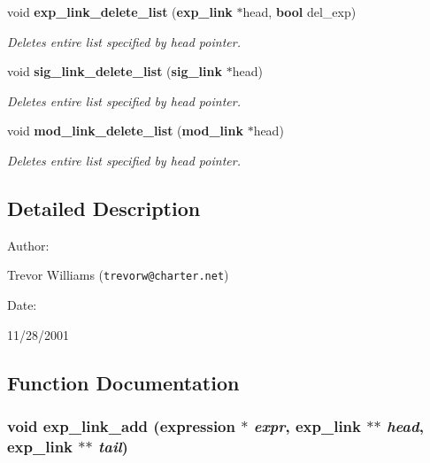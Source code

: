 \begin{CompactItemize}
void {\bf exp\_\-link\_\-delete\_\-list} ({\bf exp\_\-link} $\ast$head, {\bf bool} del\_\-exp)
\begin{CompactList}\small\item\em Deletes entire list specified by head pointer.\item\end{CompactList}\item 
void {\bf sig\_\-link\_\-delete\_\-list} ({\bf sig\_\-link} $\ast$head)
\begin{CompactList}\small\item\em Deletes entire list specified by head pointer.\item\end{CompactList}\item 
void {\bf mod\_\-link\_\-delete\_\-list} ({\bf mod\_\-link} $\ast$head)
\begin{CompactList}\small\item\em Deletes entire list specified by head pointer.\item\end{CompactList}\end{CompactItemize}


\subsection{Detailed Description}


\begin{Desc}
\item[Author: ]\par
Trevor Williams ({\tt trevorw@charter.net}) \end{Desc}
\begin{Desc}
\item[Date: ]\par
11/28/2001\end{Desc}


\subsection{Function Documentation}
\subsubsection{\setlength{\rightskip}{0pt plus 5cm}void exp\_\-link\_\-add ({\bf expression} $\ast$ {\em expr}, {\bf exp\_\-link} $\ast$$\ast$ {\em head}, {\bf exp\_\-link} $\ast$$\ast$ {\em tail})}\label{link_8c_a3}


